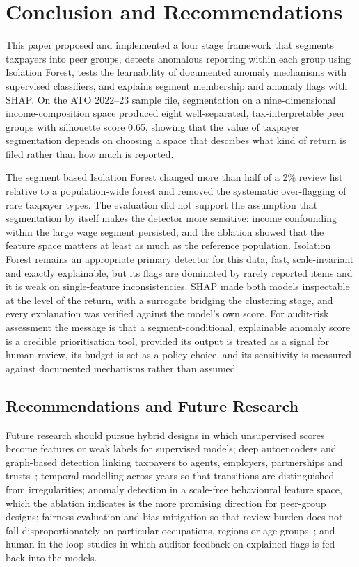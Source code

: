 \section{Conclusion and Recommendations}

This paper proposed and implemented a four stage framework that segments taxpayers into peer groups, detects anomalous reporting within each group using Isolation Forest, tests the learnability of documented anomaly mechanisms with supervised classifiers, and explains segment membership and anomaly flags with SHAP. On the ATO 2022--23 sample file, segmentation on a nine-dimensional income-composition space produced eight well-separated, tax-interpretable peer groups with silhouette score 0.65, showing that the value of taxpayer segmentation depends on choosing a space that describes what kind of return is filed rather than how much is reported.

The segment based Isolation Forest changed more than half of a 2\% review list relative to a population-wide forest and removed the systematic over-flagging of rare taxpayer types. The evaluation did not support the assumption that segmentation by itself makes the detector more sensitive: income confounding within the large wage segment persisted, and the ablation showed that the feature space matters at least as much as the reference population. Isolation Forest remains an appropriate primary detector for this data, fast, scale-invariant and exactly explainable, but its flags are dominated by rarely reported items and it is weak on single-feature inconsistencies. SHAP made both models inspectable at the level of the return, with a surrogate bridging the clustering stage, and every explanation was verified against the model's own score. For audit-risk assessment the message is that a segment-conditional, explainable anomaly score is a credible prioritisation tool, provided its output is treated as a signal for human review, its budget is set as a policy choice, and its sensitivity is measured against documented mechanisms rather than assumed.

\subsection{Recommendations and Future Research}

Future research should pursue hybrid designs in which unsupervised scores become features or weak labels for supervised models; deep autoencoders and graph-based detection linking taxpayers to agents, employers, partnerships and trusts~\cite{akoglu2015graph}; temporal modelling across years so that transitions are distinguished from irregularities; anomaly detection in a scale-free behavioural feature space, which the ablation indicates is the more promising direction for peer-group designs; fairness evaluation and bias mitigation so that review burden does not fall disproportionately on particular occupations, regions or age groups~\cite{barocas2023fairness}; and human-in-the-loop studies in which auditor feedback on explained flags is fed back into the models.
